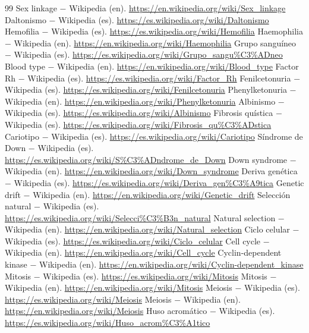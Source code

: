 \documentclass{book}
\begin{document}
\begin{thebibliography}{99}
 Sex linkage \(-\) Wikipedia (en). \url{https://en.wikipedia.org/wiki/Sex_linkage}
 Daltonismo \(-\) Wikipedia (es). \url{https://es.wikipedia.org/wiki/Daltonismo}
 Hemofilia \(-\) Wikipedia (es). \url{https://es.wikipedia.org/wiki/Hemofilia}
 Haemophilia \(-\) Wikipedia (en). \url{https://en.wikipedia.org/wiki/Haemophilia}
 Grupo sanguíneo \(-\) Wikipedia (es). \url{https://es.wikipedia.org/wiki/Grupo_sangu%C3%ADneo}
 Blood type \(-\) Wikipedia (en). \url{https://en.wikipedia.org/wiki/Blood_type}
 Factor Rh \(-\) Wikipedia (es). \url{https://es.wikipedia.org/wiki/Factor_Rh}
 Fenilcetonuria \(-\) Wikipedia (es). \url{https://es.wikipedia.org/wiki/Fenilcetonuria}
 Phenylketonuria \(-\) Wikipedia (en). \url{https://en.wikipedia.org/wiki/Phenylketonuria}
 Albinismo \(-\) Wikipedia (es). \url{https://es.wikipedia.org/wiki/Albinismo}
 Fibrosis quística \(-\) Wikipedia (es). \url{https://es.wikipedia.org/wiki/Fibrosis_qu%C3%ADstica}
 Cariotipo \(-\) Wikipedia (es). \url{https://es.wikipedia.org/wiki/Cariotipo}
 Síndrome de Down \(-\) Wikipedia (es). \url{https://es.wikipedia.org/wiki/S%C3%ADndrome_de_Down}
 Down syndrome \(-\) Wikipedia (en). \url{https://en.wikipedia.org/wiki/Down_syndrome}
 Deriva genética \(-\) Wikipedia (es). \url{https://es.wikipedia.org/wiki/Deriva_gen%C3%A9tica}
 Genetic drift \(-\) Wikipedia (en). \url{https://en.wikipedia.org/wiki/Genetic_drift}
 Selección natural \(-\) Wikipedia (es). \url{https://es.wikipedia.org/wiki/Selecci%C3%B3n_natural}
 Natural selection \(-\) Wikipedia (en). \url{https://en.wikipedia.org/wiki/Natural_selection}
 Ciclo celular \(-\) Wikipedia (es). \url{https://es.wikipedia.org/wiki/Ciclo_celular}
 Cell cycle \(-\) Wikipedia (en). \url{https://en.wikipedia.org/wiki/Cell_cycle}
 Cyclin-dependent kinase \(-\) Wikipedia (en). \url{https://en.wikipedia.org/wiki/Cyclin-dependent_kinase}
 Mitosis \(-\) Wikipedia (es). \url{https://es.wikipedia.org/wiki/Mitosis}
 Mitosis \(-\) Wikipedia (en). \url{https://en.wikipedia.org/wiki/Mitosis}
 Meiosis \(-\) Wikipedia (es). \url{https://es.wikipedia.org/wiki/Meiosis}
 Meiosis \(-\) Wikipedia (en). \url{https://en.wikipedia.org/wiki/Meiosis}
 Huso acromático \(-\) Wikipedia (es). \url{https://es.wikipedia.org/wiki/Huso_acrom%C3%A1tico}

\end{thebibliography}
\end{document}
